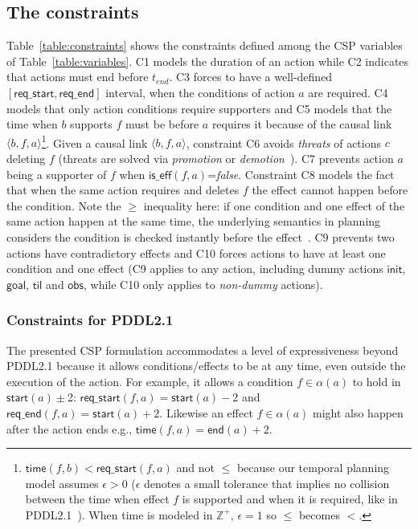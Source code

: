 \documentclass{ecai}
\newcommand{\tup}[1]{{\langle #1 \rangle}}
\newcommand{\iscond}{\mathsf{is\_cond}}    %
\newcommand{\iseff}{\mathsf{is\_eff}}    %
\newcommand{\obs}{\mathsf{obs}}    %
\newcommand{\start}{\mathsf{start}}%
\newcommand{\en}{\mathsf{end}}     %
\newcommand{\til}{\mathsf{til}}    %
\newcommand{\supp}{\mathsf{sup}}   %
\newcommand{\tim}{\mathsf{time}}   %
\newcommand{\reqs}{\mathsf{req\_{start}}} %
\newcommand{\reqe}{\mathsf{req\_{end}}}   %
\newcommand{\ini}{\mathsf{init}}   %
\newcommand{\goal}{\mathsf{goal}}  %
\begin{document}
\subsection{The constraints}
\label{section:CSPconstraints}
Table~\ref{table:constraints} shows the constraints defined among the CSP variables of Table~\ref{table:variables}. C1 models the duration of an action while C2 indicates that actions must end before $t_{end}$. C3 forces to have a well-defined $[\reqs,\reqe]$ interval, when the conditions of action $a$ are required. C4 models that only action conditions require supporters and C5 models that the time when $b$ supports $f$ must be before $a$ requires it because of the causal link $\tup{b,f,a}$\footnote{$\tim(f,b) < \reqs(f,a)$ and not $\leq$ because our temporal planning model assumes $\epsilon > 0$ ($\epsilon$ denotes a small tolerance that implies no collision between the time when effect $f$ is supported and when it is required, like in PDDL2.1~\cite{fox2003pddl2}). When time is modeled in $\mathbb{Z}^+$, $\epsilon=1$ so $\leq$ becomes $<$.}. Given a causal link $\tup{b,f,a}$, constraint C6 avoids {\em threats} of actions $c$ deleting $f$ (threats are solved via {\em promotion} or {\em demotion}~\cite{ghallab2004automated}). C7 prevents action $a$ being a supporter of $f$ when $\iseff(f,a)$=\textit{false}. Constraint C8 models the fact that when the same action requires and deletes $f$ the effect cannot happen before the condition. Note the $\geq$ inequality here: if one condition and one effect of the same action happen at the same time, the underlying semantics in planning considers the condition is checked instantly before the effect~\cite{fox2003pddl2}. C9 prevents two actions have contradictory effects and C10 forces actions to have at least one condition and one effect (C9 applies to any action, including dummy actions $\ini$, $\goal$, $\til$ and $\obs$, while C10 only applies to {\em non-dummy} actions).


\subsubsection{Constraints for PDDL2.1}
\label{sec:PDDL21constraints}
The presented CSP formulation accommodates a level of expressiveness beyond PDDL2.1 because it allows conditions/effects to be at any time, even outside the execution of the action. For example, it allows a condition $f\in\alpha(a)$ to hold in $\start(a)\pm$2: $\reqs(f,a)=\start(a)-2$ and $\reqe(f,a)=\start(a)+2$. Likewise an effect $f\in\alpha(a)$ might also happen after the action ends e.g., $\tim(f,a)=\en(a)+2$.
\end{document}
